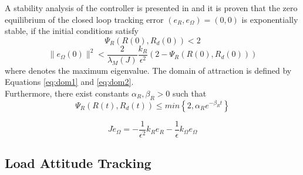 A stability analysis of the controller is presented in \cite{Lee2010} and it is proven that the zero equilibrium of the closed loop tracking error $ (e_R,e_\Omega)=(0,0) $ is exponentially stable, if the initial conditions satisfy
\begin{equation}\label{eq:dom1}
\Psi_R(R(0),R_d(0))<2
\end{equation}
\begin{equation}\label{eq:dom2}
\parallel e_\Omega(0)\parallel^2<\frac{2}{\lambda_M(J)}\frac{k_R}{\epsilon^2}(2-\Psi_R(R(0),R_d(0)))
\end{equation}
where  denotes the maximum eigenvalue. The domain of attraction is defined by Equations \ref{eq:dom1} and \ref{eq:dom2}. \\
Furthermore, there exist constants $ \alpha_R,\beta_R>0 $ such that
\begin{equation}\label{eq:con.PsiRconv}
\Psi_R(R(t),R_d(t)) \leq min\left\lbrace 2,\alpha_Re^{-\beta_Rt}\right\rbrace 
\end{equation}


\begin{equation}\label{key}
J\dot{e}_\Omega=-\frac{1}{\epsilon^2}k_Re_R-\frac{1}{\epsilon}k_\Omega e_\Omega
\end{equation} 

\subsection{Load Attitude Tracking}\label{sec:con.loadatt}



